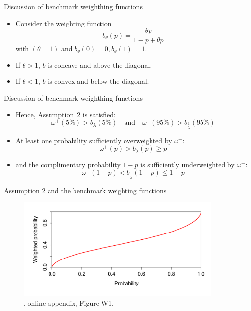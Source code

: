 \documentclass[11pt, aspectratio=169]{beamer}
\begin{document}
\begin{frame}{Discussion of benchmark weighthing functions}
    \begin{itemize}
        \item Consider the weighting function \[b_\theta (p)=\frac{\theta p}{1-p+\theta p}\]
        with $(\theta=1)$ and $b_\theta(0)=0, b_\theta(1)=1$.\medskip
        \item If $\theta>1$, $b$ is concave and above the diagonal.\medskip
        \item If $\theta<1$, $b$ is convex and below the diagonal.\medskip
	\end{itemize}
\end{frame}



\begin{frame}{Discussion of benchmark weighthing functions}
    \begin{itemize}
        \item Hence, Assumption~2 is satisfied: \[\omega ^{+}(5\%)> b_\lambda(5\%) \quad \text{and} \quad \omega ^{-}(95\%)> b_\frac{1}{\lambda}(95\%)\]
        \item At least one probability sufficiently overweighted by $\omega^+$: \[\omega^+(p)>b_{\lambda}(p) \geq p\]
        \item and the complimentary probability $1-p$ is sufficiently underweighted by $\omega^- :$
        \[\omega^-(1-p) < b_{\frac{1}{\lambda}}(1-p) \leq 1-p\]
	\end{itemize}
\end{frame}

\begin{frame}{Assumption 2 and the benchmark weighting functions}
    \begin{figure}
        \centering
        \includegraphics[width = 0.9\textwidth]{decomposition_distortions1}
        \caption{\citet{EbertStrack2015}, online appendix, Figure W1.}
    \end{figure}
\end{frame}
\end{document}
